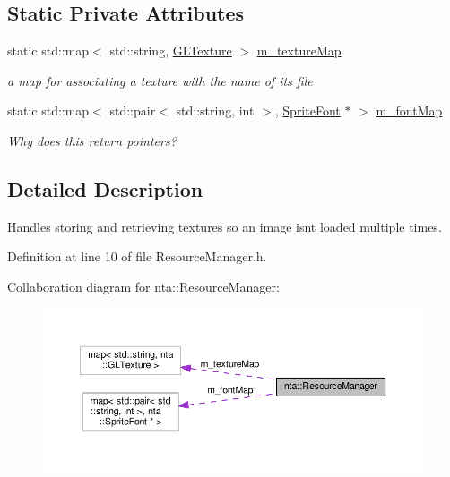 \subsection*{Static Private Attributes}
\begin{DoxyCompactItemize}
\item 
\mbox{\label{classnta_1_1ResourceManager_abf9bb10402834f05b2673e0c1d8cb9aa}} 
static std\+::map$<$ std\+::string, \hyperlink{structnta_1_1GLTexture}{G\+L\+Texture} $>$ \hyperlink{classnta_1_1ResourceManager_abf9bb10402834f05b2673e0c1d8cb9aa}{m\+\_\+texture\+Map}
\begin{DoxyCompactList}\small\item\em a map for associating a texture with the name of its file \end{DoxyCompactList}\item 
\mbox{\label{classnta_1_1ResourceManager_ac6a87b69211ba52452b4c02847ea934e}} 
static std\+::map$<$ std\+::pair$<$ std\+::string, int $>$, \hyperlink{classnta_1_1SpriteFont}{Sprite\+Font} $\ast$ $>$ \hyperlink{classnta_1_1ResourceManager_ac6a87b69211ba52452b4c02847ea934e}{m\+\_\+font\+Map}
\begin{DoxyCompactList}\small\item\em Why does this return pointers? \end{DoxyCompactList}\end{DoxyCompactItemize}


\subsection{Detailed Description}
Handles storing and retrieving textures so an image isn\textquotesingle{}t loaded multiple times. 

Definition at line 10 of file Resource\+Manager.\+h.



Collaboration diagram for nta\+:\+:Resource\+Manager\+:\nopagebreak
\begin{figure}[H]
\begin{center}
\leavevmode
\includegraphics[width=350pt]{d2/d39/classnta_1_1ResourceManager__coll__graph}
\end{center}
\end{figure}


